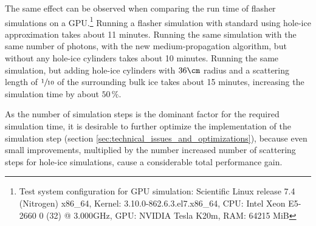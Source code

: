 %
%
%
%
%

The same effect can be observed when comparing the run time of flasher simulations on a GPU.\footnote{Test system configuration for GPU simulation: Scientific Linux release 7.4 (Nitrogen) x86\_64, Kernel: 3.10.0-862.6.3.el7.x86\_64, CPU: Intel Xeon E5-2660 0 (32) @ 3.000GHz, GPU: NVIDIA Tesla K20m, RAM: 64215 MiB}
Running a flasher simulation with standard \clsim using hole-ice approximation takes about 11 minutes. Running the same simulation with the same number of photons, with the new medium-propagation algorithm, but without any hole-ice cylinders takes about 10 minutes. Running the same simulation, but adding hole-ice cylinders with $36\cm$ radius and a scattering length of $\sfrac{1}{10}$ of the surrounding bulk ice takes about 15 minutes, increasing the simulation time by about $50\,\%$.

As the number of simulation steps is the dominant factor for the required simulation time, it is desirable to further optimize the implementation of the simulation step (section \ref{sec:technical_issues_and_optimizations}), because even small improvements, multiplied by the number increased number of scattering steps for hole-ice simulations, cause a considerable total performance gain.\followup

